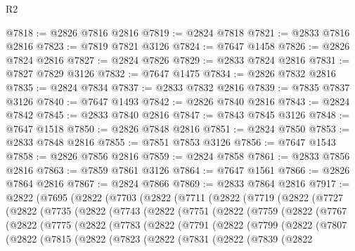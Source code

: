 \begin{lexlean}{R2}
\begin{coremodule}
@7818 := @2826 @7816 @2816
@7819 := @2824 @7818
@7821 := @2833 @7816 @2816
@7823 := @7819 @7821 @3126
@7824 := @7647 @1458
@7826 := @2826 @7824 @2816
@7827 := @2824 @7826
@7829 := @2833 @7824 @2816
@7831 := @7827 @7829 @3126
@7832 := @7647 @1475
@7834 := @2826 @7832 @2816
@7835 := @2824 @7834
@7837 := @2833 @7832 @2816
@7839 := @7835 @7837 @3126
@7840 := @7647 @1493
@7842 := @2826 @7840 @2816
@7843 := @2824 @7842
@7845 := @2833 @7840 @2816
@7847 := @7843 @7845 @3126
@7848 := @7647 @1518
@7850 := @2826 @7848 @2816
@7851 := @2824 @7850
@7853 := @2833 @7848 @2816
@7855 := @7851 @7853 @3126
@7856 := @7647 @1543
@7858 := @2826 @7856 @2816
@7859 := @2824 @7858
@7861 := @2833 @7856 @2816
@7863 := @7859 @7861 @3126
@7864 := @7647 @1561
@7866 := @2826 @7864 @2816
@7867 := @2824 @7866
@7869 := @2833 @7864 @2816
@7917 := @2822
    (@7695
      (@2822
        (@7703
          (@2822
            (@7711
              (@2822
                (@7719
                  (@2822
                    (@7727
                      (@2822
                        (@7735
                          (@2822
                            (@7743
                              (@2822
                                (@7751
                                  (@2822
                                    (@7759
                                      (@2822
                                        (@7767
                                          (@2822
                                            (@7775
                                              (@2822
                                                (@7783
                                                  (@2822
                                                    (@7791
                                                      (@2822
                                                        (@7799
                                                          (@2822
                                                            (@7807
                                                              (@2822
                                                                (@7815
                                                                  (@2822
                                                                    (@7823
                                                                      (@2822
                                                                        (@7831
                                                                          (@2822
                                                                            (@7839
                                                                              (@2822

\end{coremodule}
\end{lexlean}
